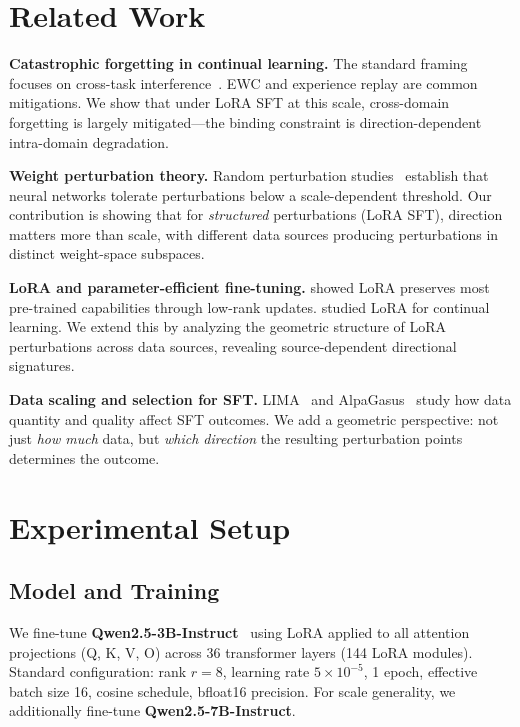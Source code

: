 \documentclass{article}
\begin{document}
\section{Related Work}

\textbf{Catastrophic forgetting in continual learning.} The standard framing focuses on cross-task interference~\citep{kirkpatrick2017overcoming, luo2023empirical}. EWC and experience replay are common mitigations. We show that under LoRA SFT at this scale, cross-domain forgetting is largely mitigated---the binding constraint is direction-dependent intra-domain degradation.

\textbf{Weight perturbation theory.} Random perturbation studies~\citep{li2018measuring} establish that neural networks tolerate perturbations below a scale-dependent threshold. Our contribution is showing that for \emph{structured} perturbations (LoRA SFT), direction matters more than scale, with different data sources producing perturbations in distinct weight-space subspaces.

\textbf{LoRA and parameter-efficient fine-tuning.} \citet{hu2022lora} showed LoRA preserves most pre-trained capabilities through low-rank updates. \citet{biderman2024lora} studied LoRA for continual learning. We extend this by analyzing the geometric structure of LoRA perturbations across data sources, revealing source-dependent directional signatures.

\textbf{Data scaling and selection for SFT.} LIMA~\citep{zhou2023lima} and AlpaGasus~\citep{chen2023alpagasus} study how data quantity and quality affect SFT outcomes. We add a geometric perspective: not just \emph{how much} data, but \emph{which direction} the resulting perturbation points determines the outcome.

\section{Experimental Setup}

\subsection{Model and Training}

We fine-tune \textbf{Qwen2.5-3B-Instruct}~\citep{yang2024qwen} using LoRA applied to all attention projections (Q, K, V, O) across 36 transformer layers (144 LoRA modules). Standard configuration: rank $r{=}8$, learning rate $5{\times}10^{-5}$, 1 epoch, effective batch size 16, cosine schedule, bfloat16 precision. For scale generality, we additionally fine-tune \textbf{Qwen2.5-7B-Instruct}.
\end{document}
